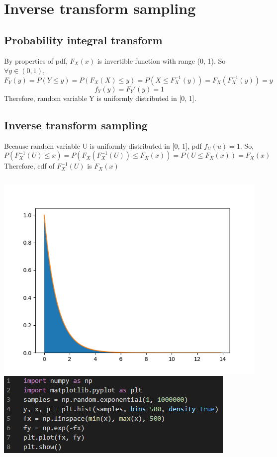 \documentclass{article}
\begin{document}
\section{Inverse transform sampling}

\subsection {Probability integral transform}

By properties of pdf, $F_X(x)$ is invertible function with range (0, 1). 
So $\forall y \in (0, 1)$, \[F_Y(y) = P(Y \leq y) = P(F_X(X) \leq y) = P(X \leq F_X^{-1}(y)) = F_X(F_X^{-1}(y)) = y\]
\[f_Y(y) = F_Y'(y) = 1\]
Therefore, random variable Y is uniformly distributed in [0, 1].

\subsection {Inverse transform sampling}

Because random variable U is uniformly distributed in [0, 1], pdf $f_U(u) = 1$. So,
\[P(F_X^{-1}(U) \leq x) = P(F_X(F_X^{-1}(U)) \leq F_X(x)) = P(U \leq F_X(x)) = F_X(x)\]
Therefore, cdf of $F_X^{-1}(U)$ is $F_X(x)$

\subsection {}
\begin{center}
\includegraphics{2-3plot.png}
\includegraphics{2-3code.png}
\end{center}
\end{document}

